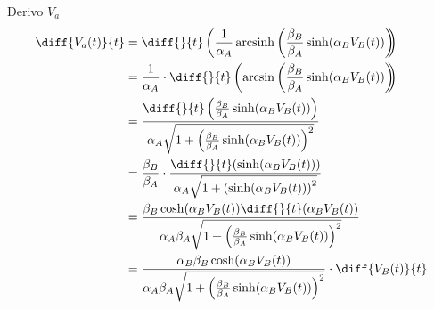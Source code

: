 		Derivo $V_{a}$
		\begin{equation}
			\label{eq:derivata}
			\begin{split}
				\diff{V_{a}(t)}{t} &= \diff{}{t}\left(\frac{1}{\alpha_{A}} \arcsinh \left(\frac{\beta_{B}}{\beta_{A}} \sinh(\alpha_{B}V_{B}(t))\right)\hspace{-5px}\right)\\
				&= \frac{1}{\alpha_{A}}\cdot\diff{}{t}\left(\arcsin\left(\frac{\beta_{B}}{\beta_{A}}\sinh(\alpha_{B}V_{B}(t))\right)\hspace{-5px}\right)\\
				&= \frac{\diff{}{t}\left(\frac{\beta_{B}}{\beta_{A}}\sinh(\alpha_{B}V_{B}(t))\right)}{\alpha_{A}\sqrt{1+\left(\frac{\beta_{B}}{\beta_{A}}\sinh(\alpha_{B}V_{B}(t))\right)^{2}}}\\
				&= \frac{\beta_{B}}{\beta_{A}}\cdot\frac{\diff{}{t}(\sinh(\alpha_{B}V_{B}(t)))}{\alpha_{A}\sqrt{1+\left(\sinh(\alpha_{B}V_{B}(t))\right)^{2}}}\\
				&= \frac{\beta_{B}\cosh(\alpha_{B}V_{B}(t))\diff{}{t}(\alpha_{B}V_{B}(t))}{\alpha_{A}\beta_{A}\sqrt{1+\left(\frac{\beta_{B}}{\beta_{A}}\sinh(\alpha_{B}V_{B}(t))\right)^{2}}}\\
				&= \frac{\alpha_{B}\beta_{B}\cosh(\alpha_{B}V_{B}(t))}{\alpha_{A}\beta_{A}\sqrt{1+\left(\frac{\beta_{B}}{\beta_{A}}\sinh(\alpha_{B}V_{B}(t))\right)^{2}}}\cdot\diff{V_{B}(t)}{t}
			\end{split}
		\end{equation}
		
